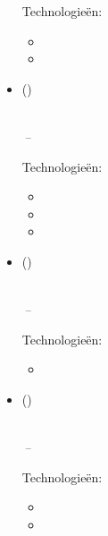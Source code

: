 \documentclass[11pt,a4paper]{article}
\begin{document}
\begin{itemize}[leftmargin=0pt,label={},itemsep=2em,topsep=0pt]
\vspace{0.2cm}
{\color{secondary}Technologieën:} \UnisysTechnologyNL
\vspace{0.3cm}
\begin{itemize}[leftmargin=*,topsep=-6pt,parsep=0pt,partopsep=0pt,itemsep=0pt]
    \item \UnisysReportingNL
    \item \UnisysDecisionsNL
\end{itemize}

\item \parbox{\textwidth}{\textbf{\ACTNameNL} {\color{secondary}\small(\ACTCompanyDescriptionNL)} \hfill \textit{\ACTLocationNL}}\\
\textit{\ACTJobTitleNL} \hfill \textit{\ACTJobStartNL\,--\,\ACTJobEndNL}

\vspace{0.2cm}
{\color{secondary}Technologieën:} \ACTTechnologyNL
\vspace{0.3cm}
\begin{itemize}[leftmargin=*,topsep=-6pt,parsep=0pt,partopsep=0pt,itemsep=0pt]
    \item \ACTFiscalNL
    \item \ACTSolutionsNL
    \item \ACTSLANL
\end{itemize}

\item \parbox{\textwidth}{\textbf{\HSBCNameNL} {\color{secondary}\small(\HSBCCompanyDescriptionNL)} \hfill \textit{\HSBCLocationNL}}\\
\textit{\HSBCJobTitleNL} \hfill \textit{\HSBCJobStartNL\,--\,\HSBCJobEndNL}

\vspace{0.2cm}
{\color{secondary}Technologieën:} \HSBCTechnologyNL
\vspace{0.3cm}
\begin{itemize}[leftmargin=*,topsep=-6pt,parsep=0pt,partopsep=0pt,itemsep=0pt]
    \item \HSBCShortNL
\end{itemize}

\item \parbox{\textwidth}{\textbf{\LloydsNameNL} {\color{secondary}\small(\LloydsCompanyDescriptionNL)} \hfill \textit{\LloydsLocationNL}}\\
\textit{\LloydsJobTitleNL} \hfill \textit{\LloydsJobStartNL\,--\,\LloydsJobEndNL}

\vspace{0.2cm}
{\color{secondary}Technologieën:} \LloydsTechnologyNL
\vspace{0.3cm}
\begin{itemize}[leftmargin=*,topsep=-6pt,parsep=0pt,partopsep=0pt,itemsep=0pt]
    \item \LloydsProjectsNL
    \item \LloydsFiscalNL
\end{itemize}


\end{itemize}
\end{document}
